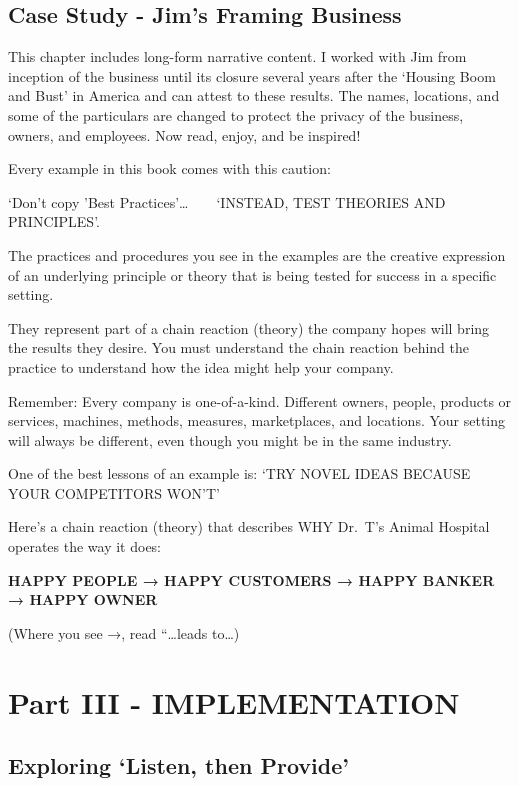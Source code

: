 \documentclass[
]{book}
\begin{document}
\hypertarget{case-study---jims-framing-business}{%
\chapter{Case Study - Jim's Framing Business}\label{case-study---jims-framing-business}}

This chapter includes long-form narrative content. I worked with Jim from inception of the business until its closure several years after the `Housing Boom and Bust' in America and can attest to these results. The names, locations, and some of the particulars are changed to protect the privacy of the business, owners, and employees. Now read, enjoy, and be inspired!

Every example in this book comes with this caution:

{`Don't copy 'Best Practices'}\ldots{} ~ ~ {`INSTEAD, TEST THEORIES AND PRINCIPLES'}.

The practices and procedures you see in the examples are the creative expression of an underlying principle or theory that is being tested for success in a specific setting.

They represent part of a chain reaction (theory) the company hopes will bring the results they desire. You must understand the chain reaction behind the practice to understand how the idea might help your company.

Remember: Every company is one-of-a-kind. Different owners, people, products or services, machines, methods, measures, marketplaces, and locations. Your setting will always be different, even though you might be in the same industry.

One of the best lessons of an example is: {`TRY NOVEL IDEAS BECAUSE YOUR COMPETITORS WON'T'}

Here's a chain reaction (theory) that describes WHY Dr.~T's Animal Hospital operates the way it does:

\textbf{HAPPY PEOPLE {→} HAPPY CUSTOMERS {→} HAPPY BANKER {→} HAPPY OWNER}

(Where you see {→}, read ``\ldots leads to\ldots)

\hypertarget{part-part-iii---implementation}{%
\part*{Part III - IMPLEMENTATION}\label{part-part-iii---implementation}}


\hypertarget{exploring-listen-then-provide}{%
\chapter{\texorpdfstring{Exploring {`Listen, then Provide'}}{Exploring `Listen, then Provide'}}\label{exploring-listen-then-provide}}
\end{document}
